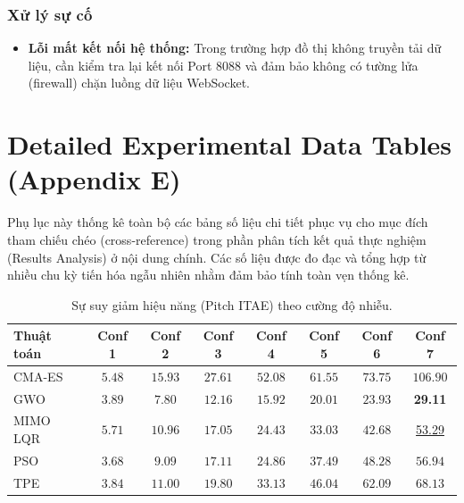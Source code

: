 \documentclass[conference, a4paper]{IEEEtran}
\begin{document}
\subsubsection{Xử lý sự cố}
\begin{itemize}
    \item \textbf{Lỗi mất kết nối hệ thống:} Trong trường hợp đồ thị không truyền tải dữ liệu, cần kiểm tra lại kết nối Port 8088 và đảm bảo không có tường lửa (firewall) chặn luồng dữ liệu WebSocket.
\end{itemize}


\section{Detailed Experimental Data Tables (Appendix E)}
Phụ lục này thống kê toàn bộ các bảng số liệu chi tiết phục vụ cho mục đích tham chiếu chéo (cross-reference) trong phần phân tích kết quả thực nghiệm (Results Analysis) ở nội dung chính. Các số liệu được đo đạc và tổng hợp từ nhiều chu kỳ tiến hóa ngẫu nhiên nhằm đảm bảo tính toàn vẹn thống kê.

\begin{table}[h!]
\caption{Sự suy giảm hiệu năng (Pitch ITAE) theo cường độ nhiễu.}
\label{tab:rq3-robustness-metrics}
\centering
\small
\begin{tabular}{lccccccc}
\toprule
Thuật toán & Conf 1 & Conf 2 & Conf 3 & Conf 4 & Conf 5 & Conf 6 & Conf 7 \\
\midrule
CMA-ES & $5.48$ & $15.93$ & $27.61$ & $52.08$ & $61.55$ & $73.75$ & $106.90$ \\
GWO & $3.89$ & $7.80$ & $12.16$ & $15.92$ & $20.01$ & $23.93$ & \textbf{29.11} \\
MIMO LQR & $5.71$ & $10.96$ & $17.05$ & $24.43$ & $33.03$ & $42.68$ & \underline{53.29} \\
PSO & $3.68$ & $9.09$ & $17.11$ & $24.86$ & $37.49$ & $48.28$ & $56.94$ \\
TPE & $3.84$ & $11.00$ & $19.80$ & $33.13$ & $46.04$ & $62.09$ & $68.13$ \\
\bottomrule
\end{tabular}
\end{table}
\end{document}
